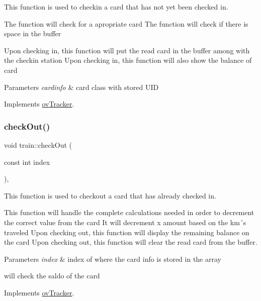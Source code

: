 This function is used to checkin a card that has not yet been checked in. 

The function will check for a apropriate card The function will check if there is space in the buffer

Upon checking in, this function will put the read card in the buffer among with the checkin station Upon checking in, this function will also show the balance of card 
\begin{DoxyParams}{Parameters}
{\em cardinfo} & card class with stored U\+ID \\
\hline
\end{DoxyParams}


Implements \hyperlink{classovTracker_a1d5cd8f5a6bd02c91d6d010f1a3839ce}{ov\+Tracker}.

\mbox{\label{classtrain_ae631814ed393394a525646ada78e1994}} 
\subsubsection{\texorpdfstring{check\+Out()}{checkOut()}}
{\footnotesize\ttfamily void train\+::check\+Out (\begin{DoxyParamCaption}\item[{const int}]{index }\end{DoxyParamCaption})\hspace{0.3cm}{\ttfamily [override]}, {\ttfamily [virtual]}}



This function is used to checkout a card that has already checked in. 

This function will handle the complete calculations needed in order to decrement the correct value from the card It will decrement x amount based on the km´s traveled Upon checking out, this function will display the remaining balance on the card Upon checking out, this function will clear the read card from the buffer. 
\begin{DoxyParams}{Parameters}
{\em index} & index of where the card info is stored in the array \\
\hline
\end{DoxyParams}
will check the saldo of the card 

Implements \hyperlink{classovTracker_a96e808776b864290f742f271e18c401c}{ov\+Tracker}.

\mbox{\label{classtrain_a76824298a986f6a897b3e7cba2c8f15d}} 
